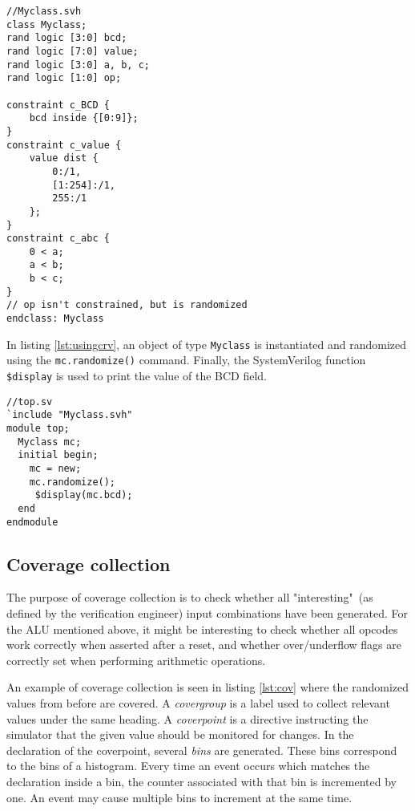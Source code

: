 \documentclass[journal]{IEEEtran}
\newcommand{\SV}{SystemVerilog\xspace}
\begin{document}
\begin{listing}[htbp]
\begin{verbatim}
//Myclass.svh
class Myclass;
rand logic [3:0] bcd;
rand logic [7:0] value;
rand logic [3:0] a, b, c;
rand logic [1:0] op;

constraint c_BCD {
	bcd inside {[0:9]};
}
constraint c_value {
	value dist {
		0:/1,
		[1:254]:/1,
		255:/1
	};
}
constraint c_abc {
	0 < a;
	a < b;
	b < c;
}
// op isn't constrained, but is randomized
endclass: Myclass
\end{verbatim}
\caption{Example SystemVerilog code showing how different values are constrained.}
\label{lst:crv}
\end{listing}

In listing \ref{lst:usingcrv}, an object of type \texttt{Myclass} is instantiated and randomized using the \texttt{mc.randomize()} command. Finally, the \SV function \texttt{\$display} is used to print the value of the BCD field.

\begin{listing}[htbp]
\begin{verbatim}
//top.sv
`include "Myclass.svh"
module top;
  Myclass mc;
  initial begin;
    mc = new;
    mc.randomize();
	 $display(mc.bcd);
  end
endmodule
\end{verbatim}
\caption{Example SystemVerilog code showing how to instantiate and randomize a class with random fields.}
\label{lst:usingcrv}
\end{listing}

\subsection{Coverage collection}
The purpose of coverage collection is to check whether all "interesting"\, (as defined by the verification engineer) input combinations have been generated. For the ALU mentioned above, it might be interesting to check whether all opcodes work correctly when asserted after a reset, and whether over/underflow flags are correctly set when performing arithmetic operations. 

An example of coverage collection is seen in listing \ref{lst:cov} where the randomized values from before are covered. A \textit{covergroup} is a label used to collect relevant values under the same heading. A \textit{coverpoint} is a directive instructing the simulator that the given value should be monitored for changes. In the declaration of the coverpoint, several \textit{bins} are generated. These bins correspond to the bins of a histogram. Every time an event occurs which matches the declaration inside a bin, the counter associated with that bin is incremented by one. An event may cause multiple bins to increment at the same time.
\end{document}
